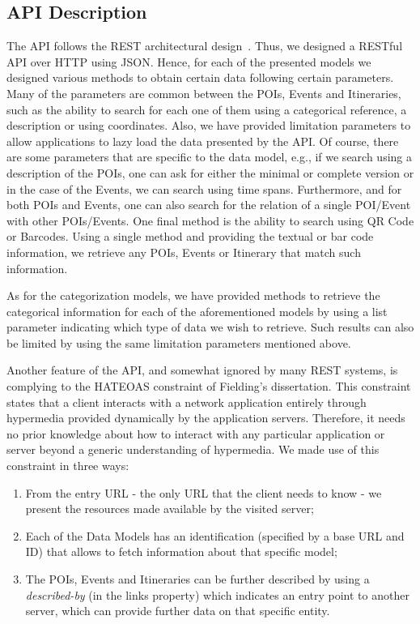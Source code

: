 \documentclass[times]{ettauth}
\begin{document}
\subsection{API Description}
\label{api-description}
The API follows the \ac{REST} architectural design~\cite{Fielding:2002:PDM:514183.514185}. Thus, we designed a RESTful API over HTTP using JSON. Hence, for each of the presented models we designed various methods to obtain certain data following certain parameters. Many of the parameters are common between the \acp{POI}, Events and Itineraries, such as the ability to search for each one of them using a categorical reference, a description or using coordinates. Also, we have provided limitation parameters to allow applications to lazy load the data presented by the API. Of course, there are some parameters that are specific to the data model, e.g., if we search using a description of the \acp{POI}, one can ask for either the minimal or complete version or in the case of the Events, we can search using time spans. Furthermore, and for both \acp{POI} and Events, one can also search for the relation of a single \ac{POI}/Event with other \acp{POI}/Events. One final method is the ability to search using QR Code or Barcodes. Using a single method and providing the textual or bar code information, we retrieve any POIs, Events or Itinerary that match such information.

As for the categorization models, we have provided methods to retrieve the categorical information for each of the aforementioned models by using a list parameter indicating which type of data we wish to retrieve. Such results can also be limited by using the same limitation parameters mentioned above.

Another feature of the API, and somewhat ignored by many REST systems, is complying to the \acf{HATEOAS} constraint of Fielding's dissertation. This constraint states that a client interacts with a network application entirely through hypermedia provided dynamically by the application servers. Therefore, it needs no prior knowledge about how to interact with any particular application or server beyond a generic understanding of hypermedia. We made use of this constraint in three ways:
\begin{enumerate}
\item From the entry URL - the only URL that the client needs to know - we present the resources made available by the visited server;
\item Each of the Data Models has an identification (specified by a base URL and ID) that allows to fetch information about that specific model;
\item The POIs, Events and Itineraries can be further described by using a \textit{described-by} (in the links property) which indicates an entry point to another server, which can provide further data on that specific entity.
\end{enumerate}
\end{document}
